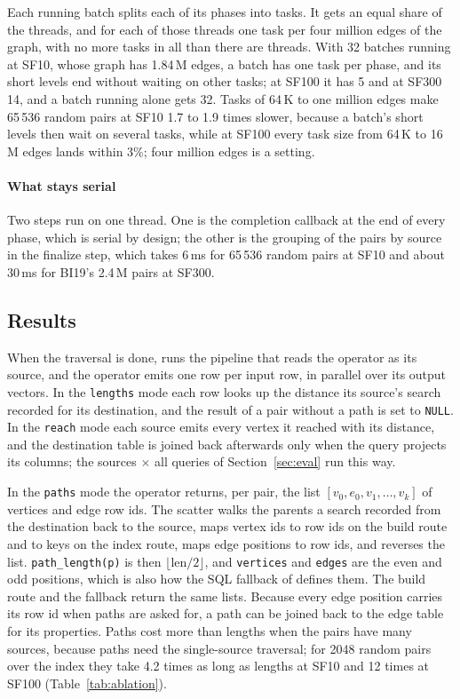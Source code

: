 Each running batch splits each of its phases into tasks. It gets an equal share of the threads, and for each of
those threads one task per four million edges of the graph, with no more tasks in all than there are threads. With 32
batches running at SF10, whose graph has 1.84\,M edges, a batch has one task per phase, and its short levels end
without waiting on other tasks; at SF100 it has 5 and at SF300 14, and a batch running alone gets 32. Tasks of 64\,K to one million edges make 65\,536 random pairs at SF10 1.7 to 1.9 times slower, because a batch's short levels then wait on several tasks, while at SF100 every task size from 64\,K to 16\,M edges lands within 3\%; four million edges is a setting.

\paragraph{What stays serial} Two steps run on one thread. One is the completion callback at the end of every phase, which is
serial by design; the other is the grouping of the pairs by source in the finalize step, which takes 6\,ms for 65\,536 random pairs at SF10 and about
30\,ms for BI19's 2.4\,M pairs at SF300.

\subsection{Results}
\label{sec:results}

When the traversal is done, \duckdb runs the pipeline that reads the operator as its source, and the operator emits
one row per input row, in parallel over its output vectors. In the \texttt{lengths} mode each row looks up the distance its
source's search recorded for its destination, and the result of a pair without a path is set to \texttt{NULL}. In the \texttt{reach} mode each source emits every vertex it reached with its distance, and the destination table is
joined back afterwards only when the query projects its columns; the sources $\times$ all queries of
Section~\ref{sec:eval} run this way.

In the \texttt{paths} mode the operator returns, per pair, the list $[v_0,\allowbreak e_0,\allowbreak v_1,\allowbreak \dots,\allowbreak v_k]$ of vertices and edge row
ids. The scatter walks the parents a search recorded from the destination back to the source, maps vertex ids to row
ids on the build route and to keys on the index route, maps edge positions to row ids, and reverses the list.
\texttt{path\_length(p)} is then $\lfloor\text{len}/2\rfloor$, and \texttt{vertices} and \texttt{edges} are the even
and odd positions, which is also how the SQL fallback of \duckpgq defines them. The build route and the fallback return the same
lists. Because every edge position carries its row id when paths are asked for, a path can be joined
back to the edge table for its properties. Paths cost more than lengths when the pairs have many sources, because
paths need the single-source traversal; for 2048 random pairs over the index they take 4.2 times as long as lengths at SF10 and 12 times at SF100 (Table~\ref{tab:ablation}).
